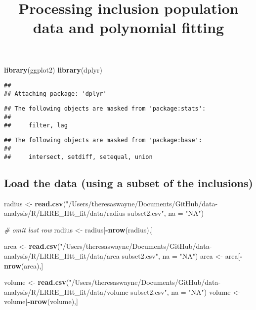 \documentclass[]{article}
\title{Processing inclusion population data and polynomial fitting}
\author{}
\date{\vspace{-2.5em}}
\newenvironment{Shaded}{\begin{snugshade}}{\end{snugshade}}
\newcommand{\CommentTok}[1]{\textcolor[rgb]{0.56,0.35,0.01}{\textit{#1}}}
\newcommand{\DataTypeTok}[1]{\textcolor[rgb]{0.13,0.29,0.53}{#1}}
\newcommand{\KeywordTok}[1]{\textcolor[rgb]{0.13,0.29,0.53}{\textbf{#1}}}
\newcommand{\NormalTok}[1]{#1}
\newcommand{\OperatorTok}[1]{\textcolor[rgb]{0.81,0.36,0.00}{\textbf{#1}}}
\newcommand{\StringTok}[1]{\textcolor[rgb]{0.31,0.60,0.02}{#1}}
\begin{document}
\maketitle

\begin{Shaded}
\begin{Highlighting}[]
\KeywordTok{library}\NormalTok{(ggplot2)}
\KeywordTok{library}\NormalTok{(dplyr)}
\end{Highlighting}
\end{Shaded}

\begin{verbatim}
## 
## Attaching package: 'dplyr'
\end{verbatim}

\begin{verbatim}
## The following objects are masked from 'package:stats':
## 
##     filter, lag
\end{verbatim}

\begin{verbatim}
## The following objects are masked from 'package:base':
## 
##     intersect, setdiff, setequal, union
\end{verbatim}

\hypertarget{load-the-data-using-a-subset-of-the-inclusions}{%
\subsection{Load the data (using a subset of the
inclusions)}\label{load-the-data-using-a-subset-of-the-inclusions}}

\begin{Shaded}
\begin{Highlighting}[]
\NormalTok{radius <-}\StringTok{ }\KeywordTok{read.csv}\NormalTok{(}\StringTok{"/Users/theresaswayne/Documents/GitHub/data-analysis/R/LRRE_Htt_fit/data/radius subset2.csv"}\NormalTok{, }\DataTypeTok{na =} \StringTok{"NA"}\NormalTok{)}

\CommentTok{# omit last row}
\NormalTok{radius <-}\StringTok{ }\NormalTok{radius[}\OperatorTok{-}\KeywordTok{nrow}\NormalTok{(radius),]}

\NormalTok{area <-}\StringTok{ }\KeywordTok{read.csv}\NormalTok{(}\StringTok{"/Users/theresaswayne/Documents/GitHub/data-analysis/R/LRRE_Htt_fit/data/area subset2.csv"}\NormalTok{, }\DataTypeTok{na =} \StringTok{"NA"}\NormalTok{)}
\NormalTok{area <-}\StringTok{ }\NormalTok{area[}\OperatorTok{-}\KeywordTok{nrow}\NormalTok{(area),]}

\NormalTok{volume <-}\StringTok{ }\KeywordTok{read.csv}\NormalTok{(}\StringTok{"/Users/theresaswayne/Documents/GitHub/data-analysis/R/LRRE_Htt_fit/data/volume subset2.csv"}\NormalTok{, }\DataTypeTok{na =} \StringTok{"NA"}\NormalTok{)}
\NormalTok{volume <-}\StringTok{ }\NormalTok{volume[}\OperatorTok{-}\KeywordTok{nrow}\NormalTok{(volume),]}
\end{Highlighting}
\end{Shaded}
\end{document}
